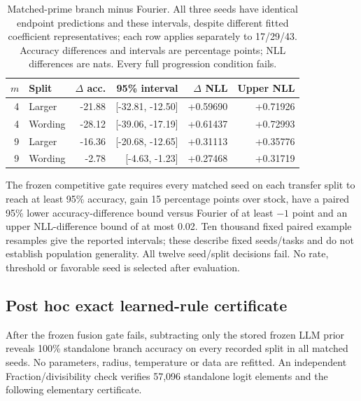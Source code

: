\documentclass[11pt]{article}
\begin{document}
\begin{table}[htbp]
\centering\small
\caption{Matched-prime branch minus Fourier. All three seeds have identical
endpoint predictions and these intervals, despite different fitted coefficient
representatives; each row applies separately to 17/29/43. Accuracy differences
and intervals are percentage points; NLL differences are nats. Every full
progression condition fails.}
\label{tab:modular-paired}
\begin{tabular}{rlrrrr}
\toprule
$m$ & Split & $\Delta$ acc. & 95\% interval & $\Delta$ NLL & Upper NLL\\
\midrule
4 & Larger & -21.88 & [-32.81, -12.50] & +0.59690 & +0.71926\\
4 & Wording & -28.12 & [-39.06, -17.19] & +0.61437 & +0.72993\\
9 & Larger & -16.36 & [-20.68, -12.65] & +0.31113 & +0.35776\\
9 & Wording & -2.78 & [-4.63, -1.23] & +0.27468 & +0.31719\\
\bottomrule
\end{tabular}
\end{table}

The frozen competitive gate requires every matched seed on each transfer
split to reach at least 95\% accuracy, gain 15 percentage points over stock,
have a paired 95\% lower accuracy-difference bound versus Fourier of at least
\(-1\) point and an upper NLL-difference bound of at most 0.02.
Ten thousand fixed paired example resamples give the reported intervals;
these describe fixed seeds/tasks and do not establish population generality.
All twelve seed/split decisions fail. No rate, threshold or favorable seed
is selected after evaluation.

\subsection{Post hoc exact learned-rule certificate}

After the frozen fusion gate fails, subtracting only the stored frozen LLM
prior reveals 100\% standalone branch accuracy on every recorded split in
all matched seeds. No parameters, radius, temperature or data are refitted.
An independent Fraction/divisibility check verifies 57,096 standalone
logit elements and the following elementary certificate.
\end{document}
